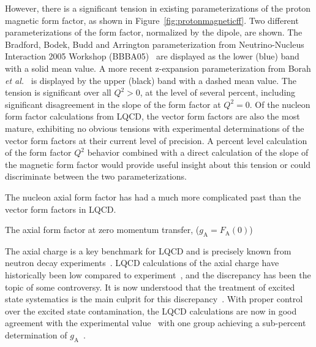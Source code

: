 However, there is a significant tension in existing parameterizations of the proton magnetic form factor, as
shown in Figure~\ref{fig:protonmagneticff}.
Two different parameterizations of the form factor, normalized by the dipole, are shown.
The Bradford, Bodek, Budd and Arrington parameterization from Neutrino-Nucleus Interaction 2005 Workshop (BBBA05)~\cite{Bradford:2006yz} are displayed as the lower (blue) band with a solid mean value.
A more recent z-expansion parameterization from Borah {\it et al.}~\cite{Borah:2020gte} is displayed by the upper (black) band with a dashed mean value.
The tension is significant over all $Q^2 > 0$, at the level of several percent,
including significant disagreement in the slope of the form factor at $Q^2 = 0$.
Of the nucleon form factor calculations from LQCD,
the vector form factors are also the most mature,
exhibiting no obvious tensions with experimental determinations
of the vector form factors at their current level of precision.
A percent level calculation of the form factor $Q^2$ behavior combined with a direct calculation of the slope of the magnetic form factor would provide useful insight about this tension or could discriminate
between the two parameterizations.

The nucleon axial form factor has had a much more complicated past than the vector form factors in LQCD.%
\begin{marginnote}
  {The} axial form factor at zero momentum transfer, ($g_{\mathrm{A}} = F_{\mathrm{A}}(0)$)
\end{marginnote}%
The axial charge is a key benchmark for LQCD and is precisely known
from neutron decay experiments~\cite{Dubbers:2021wqv}.
LQCD calculations of the axial charge have historically been low compared to experiment~\cite{Aoki:2021kgd},
 and the discrepancy has been the topic of some controversy.
It is now understood that the treatment of excited state systematics is the main culprit for this discrepancy~\cite{Bar:2017kxh,Ottnad:2020qbw,Aoki:2021kgd}.
With proper control over the excited state contamination, the LQCD calculations are now in good agreement with the experimental value~\cite{Jang:2019vkm,Gupta:2018qil,Alexandrou:2020okk,Abramczyk:2019fnf,Park:2021ypf,RQCD:2019jai,Hasan:2019noy,Djukanovic:2021yqg,Harris:2019bih,Liang:2018pis,Shintani:2018ozy,Ishikawa:2018rew}
 with one group achieving a sub-percent determination of $g_{\mathrm{A}}$~\cite{Chang:2018uxx,Berkowitz:2018gqe,Walker-Loud:2019cif}.

